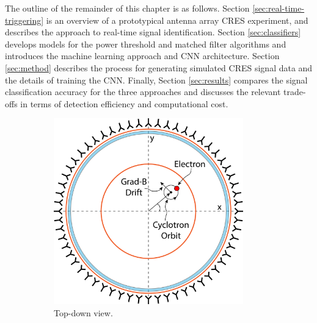 The outline of the remainder of this chapter is as follows. Section \ref{sec:real-time-triggering} is an overview of a prototypical antenna array CRES experiment, and describes the approach to real-time signal identification. Section \ref{sec:classifiers} develops models for the power threshold and matched filter algorithms and introduces the machine learning approach and CNN architecture. Section \ref{sec:method} describes the process for generating simulated CRES signal data and the details of training the CNN. Finally, Section \ref{sec:results} compares the signal classification accuracy for the three approaches and discusses the relevant trade-offs in terms of detection efficiency and computational cost.

\begin{figure}[h]
    \centering
    \begin{subfigure}{0.48\textwidth}
        \centering
        \includegraphics[width=0.9\textwidth]{figs/Chapter-4/230328_deepfilter_paper_apparatus_concept_top_v2.png}
        \caption{Top-down view.}
        \label{fig:apparatus_concept_top}
    \end{subfigure}
    \begin{subfigure}{0.48\textwidth}
        \centering

\end{subfigure}
\end{figure}

